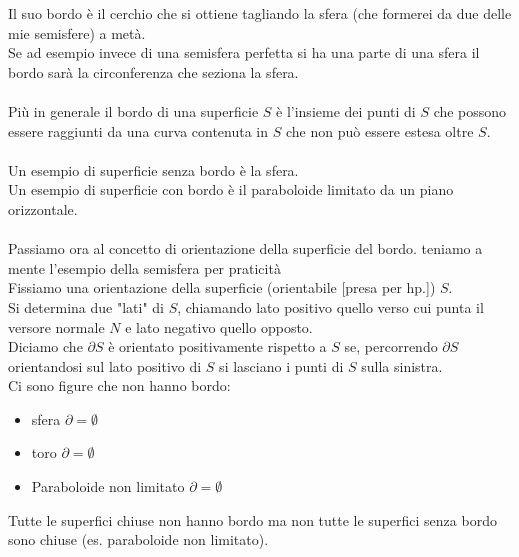 \documentclass[a4paper, oneside]{article}
\begin{document}
Il suo bordo è il cerchio che si ottiene tagliando la sfera (che formerei da due delle mie semisfere) a metà.\\
Se ad esempio invece di una semisfera perfetta si ha una parte di una sfera il bordo sarà la circonferenza che seziona la sfera.\\
\hfill\\
Più in generale il bordo di una superficie $S$ è l'insieme dei punti di $S$ che 
possono essere raggiunti da una curva contenuta in $S$ che non può essere 
estesa oltre $S$.\\
\hfill\\
Un esempio di superficie senza bordo è la sfera.\\
Un esempio di superficie con bordo è il paraboloide limitato da un piano orizzontale.
\hfill\\ 
\hfill\\ 
Passiamo ora al concetto di orientazione della superficie del bordo. teniamo a mente l'esempio della semisfera per praticità\\
Fissiamo una orientazione della superficie (orientabile [presa per hp.]) $S$.\\
Si determina due "lati" di $S$, chiamando lato positivo quello verso cui punta il versore normale $N$ e lato negativo quello opposto.\\
Diciamo che $\partial S$ è orientato positivamente rispetto a $S$ se, percorrendo $\partial S$ orientandosi sul lato positivo di $S$ si lasciano i punti di $S$ sulla sinistra.\\
Ci sono figure che non hanno bordo:
\begin{itemize}
  \item sfera $\partial = \emptyset$
  \item toro $\partial = \emptyset$
  \item Paraboloide non limitato $\partial = \emptyset$
\end{itemize}
Tutte le superfici chiuse non hanno bordo ma non tutte le superfici senza bordo sono chiuse (es. paraboloide non limitato).


\newpage
\end{document}

